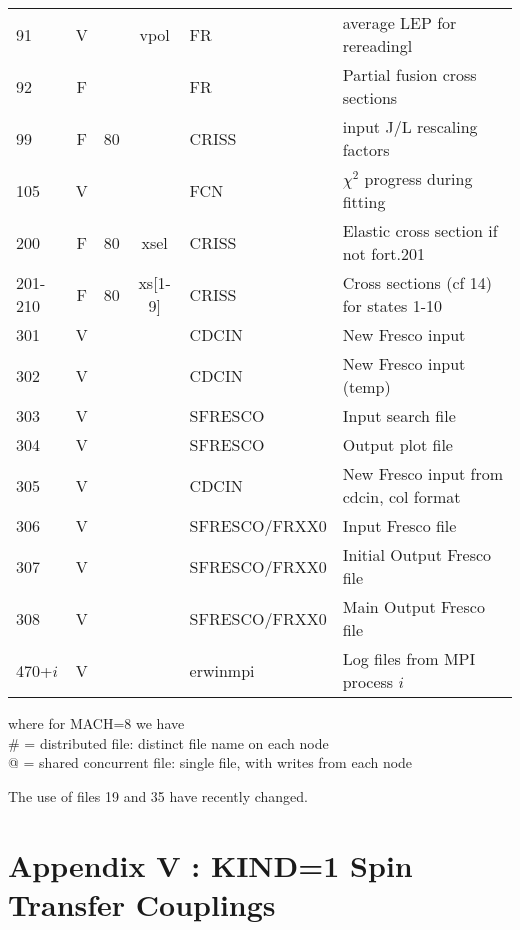 \documentclass[11pt]{article}
\begin{document}
\begin{tabular}{|l | c c c | l | l|}
91    &  V &           &vpol &       FR   &   average LEP for rereadingl\\
92    &   F &            &    &     FR& Partial fusion cross sections\\
99     & F &    80   & &     CRISS   &  input J/L rescaling factors\\
105     & V &         & &     FCN   &  $\chi^2$ progress during fitting\\
200 & F & 80     &xsel &     CRISS   & Elastic cross section if not fort.201 \\
201-210 & F & 80     &xs[1-9] &     CRISS   & Cross sections (cf 14) for states 1-10\\
301 & V &      & &     CDCIN   & New Fresco input \\
302 & V &      & &     CDCIN   & New Fresco input  (temp) \\
303 & V &      & &     SFRESCO   & Input search file \\
304 & V &      & &     SFRESCO   & Output plot file \\
305 & V &      & &     CDCIN   & New Fresco input from cdcin, col format \\
306 & V &      & &     SFRESCO/FRXX0   & Input Fresco file \\
307 & V &      & &     SFRESCO/FRXX0   & Initial Output Fresco file \\
308 & V &      & &     SFRESCO/FRXX0   & Main Output Fresco file \\
470+$i$ & V &       & &     erwinmpi   & Log files from MPI process $i$ \\
\hline
\end{tabular}

where  for MACH=8 we have\\
\#  = distributed file: distinct file name on each node\\
@  = shared concurrent file: single file, with writes from each node

The use of files 19 and 35 have recently changed.

\newpage
\section*{Appendix V : KIND=1 Spin Transfer Couplings}

\large
\end{document}
